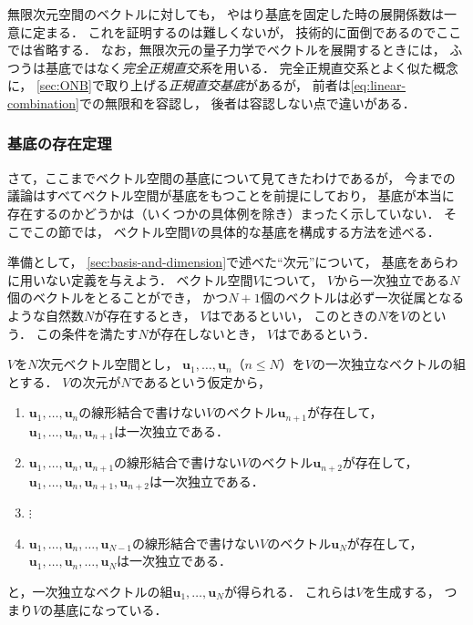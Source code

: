 \documentclass[
]{sotsu}
\begin{document}
無限次元空間のベクトルに対しても，
やはり基底を固定した時の展開係数は一意に定まる．
これを証明するのは難しくないが，
技術的に面倒であるのでここでは省略する．
なお，無限次元の量子力学でベクトルを展開するときには，
ふつうは基底ではなく\emph{完全正規直交系}を用いる．
完全正規直交系とよく似た概念に，
\cref{sec:ONB}で取り上げる\emph{正規直交基底}があるが，
前者は\cref{eq:linear-combination}での無限和を容認し，
後者は容認しない点で違いがある．



\subsubsection{基底の存在定理}
\label{sec:existence-of-basis}

さて，ここまでベクトル空間の基底について見てきたわけであるが，
今までの議論はすべてベクトル空間が基底をもつことを前提にしており，
基底が本当に存在するのかどうかは（いくつかの具体例を除き）まったく示していない．
そこでこの節では，
ベクトル空間$V$の具体的な基底を構成する方法を述べる．

準備として，
\cref{sec:basis-and-dimension}で述べた``次元''について，
基底をあらわに用いない定義を与えよう．
ベクトル空間$V$について，
$V$から一次独立である$N$個のベクトルをとることができ，
かつ$N + 1$個のベクトルは必ず一次従属となるような自然数$N$が存在するとき，
$V$はであるといい，
このときの$N$を$V$のという．
この条件を満たす$N$が存在しないとき，
$V$はであるという．



\quad 
$V$を$N$次元ベクトル空間とし，
$\symbf{u}_1, \dots, \symbf{u}_n$（$n \leq N$）を$V$の一次独立なベクトルの組とする．
$V$の次元が$N$であるという仮定から，
\begin{enumerate}[leftmargin={6em}]
    \item[($1$) ] $\symbf{u}_1, \dots, \symbf{u}_n$の線形結合で書けない$V$のベクトル$\symbf{u}_{n+1}$が存在して，
        $\symbf{u}_1, \dots, \symbf{u}_n, \symbf{u}_{n+1}$は一次独立である．
    \item[($2$) ] $\symbf{u}_1, \dots, \symbf{u}_n, \symbf{u}_{n+1}$の線形結合で書けない$V$のベクトル$\symbf{u}_{n+2}$が存在して，
        $\symbf{u}_1, \dots, \symbf{u}_n, \symbf{u}_{n+1}, \symbf{u}_{n+2}$は一次独立である．
    \item[$\vdots$\hspace{1ex} ] \hspace{0.4\linewidth} $\vdots$
    \item[($N-n$) ] $\symbf{u}_1, \dots, \symbf{u}_n, \dots, \symbf{u}_{N-1}$の線形結合で書けない$V$のベクトル$\symbf{u}_N$が存在して，
        $\symbf{u}_1, \dots, \symbf{u}_n, \dots, \symbf{u}_N$は一次独立である．
\end{enumerate}
と，一次独立なベクトルの組$\symbf{u}_1, \dots, \symbf{u}_N$が得られる．
これらは$V$を生成する，
つまり$V$の基底になっている．
\end{document}

